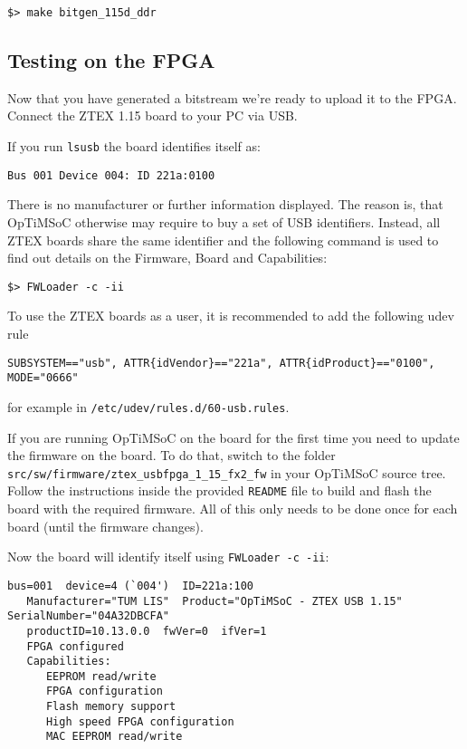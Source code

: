 \begin{lstlisting}
$> make bitgen_115d_ddr
\end{lstlisting}

\subsection{Testing on the FPGA}
Now that you have generated a bitstream we're ready to upload it to the FPGA.
Connect the ZTEX 1.15 board to your PC via USB.

If you run \verb|lsusb| the board identifies itself as:

\begin{lstlisting}
Bus 001 Device 004: ID 221a:0100
\end{lstlisting}

There is no manufacturer or further information displayed. The reason
is, that OpTiMSoC otherwise may require to buy a set of USB
identifiers. Instead, all ZTEX boards share the same identifier and
the following command is used to find out details on the Firmware,
Board and Capabilities:

\begin{lstlisting}
$> FWLoader -c -ii
\end{lstlisting}

To use the ZTEX boards as a user, it is recommended to add the following
udev rule

\begin{lstlisting}
SUBSYSTEM=="usb", ATTR{idVendor}=="221a", ATTR{idProduct}=="0100", MODE="0666"
\end{lstlisting}

for example in \verb|/etc/udev/rules.d/60-usb.rules|.

If you are running OpTiMSoC on the board for the first time you need to update
the firmware on the board. To do that, switch to the folder
\verb|src/sw/firmware/ztex_usbfpga_1_15_fx2_fw| in your OpTiMSoC source tree.
Follow the instructions inside the provided \verb|README| file to build and
flash the board with the required firmware. All of this only needs to be done
once for each board (until the firmware changes).

Now the board will identify itself using \verb|FWLoader -c -ii|:

\begin{lstlisting}
bus=001  device=4 (`004')  ID=221a:100
   Manufacturer="TUM LIS"  Product="OpTiMSoC - ZTEX USB 1.15"    SerialNumber="04A32DBCFA"
   productID=10.13.0.0  fwVer=0  ifVer=1
   FPGA configured
   Capabilities:
      EEPROM read/write
      FPGA configuration
      Flash memory support
      High speed FPGA configuration
      MAC EEPROM read/write
\end{lstlisting}

